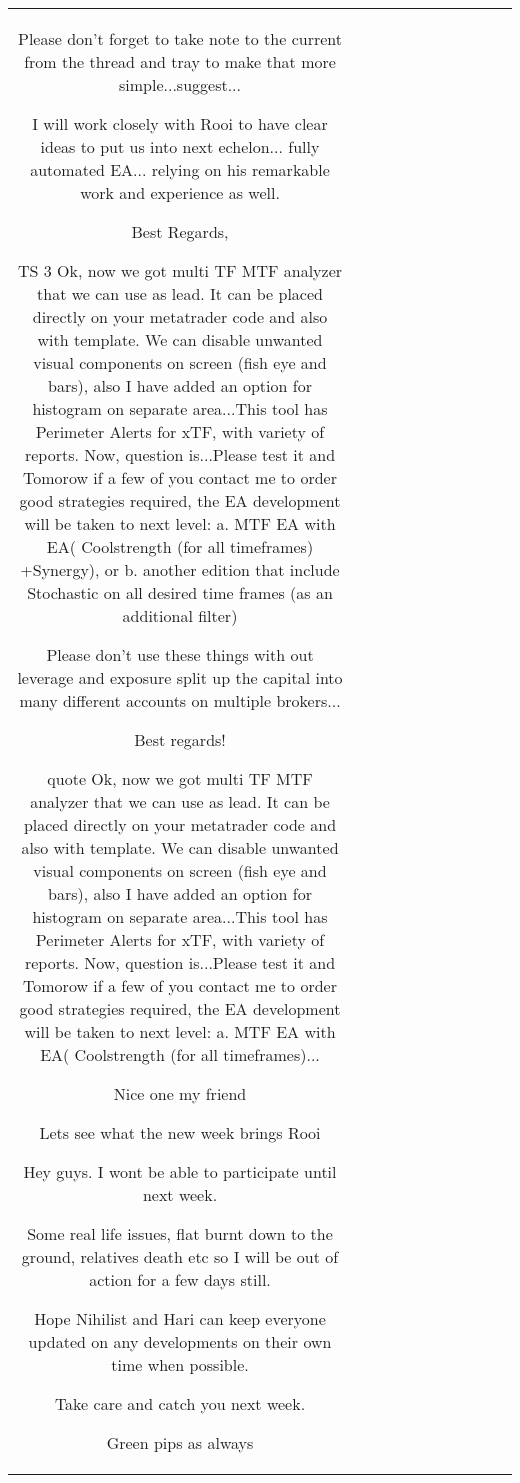 \begin{table}[h!]
\begin{tabular}{|c|c|c|c|c|c|c|c|c|c|c|}
Please don't forget to take note to the current from the thread and tray to make that more simple...suggest...

I will work closely with Rooi to have clear ideas to put us into next echelon... fully automated EA... relying on his remarkable work and experience as well.

Best Regards, 

TS
3
Ok, now we got multi TF MTF analyzer that we can use as lead. It can be placed directly on your metatrader code and also with template.
We can disable unwanted visual components on screen (fish eye and bars), also I have added an option for histogram on separate area...This tool has Perimeter Alerts for xTF, with variety of reports.
Now, question is...Please test it and Tomorow if a few of you contact me to order good strategies required, the EA development will be taken to next level: a. MTF EA with EA( Coolstrength (for all timeframes) +Synergy), or b. another edition that include Stochastic on all desired time frames (as an additional filter)

Please don't use these things with out leverage and exposure split up the capital into many different accounts on multiple brokers...

Best regards!

{quote} Ok, now we got multi TF MTF analyzer that we can use as lead. It can be placed directly on your metatrader code and also with template. We can disable unwanted visual components on screen (fish eye and bars), also I have added an option for histogram on separate area...This tool has Perimeter Alerts for xTF, with variety of reports. Now, question is...Please test it and Tomorow if a few of you contact me to order good strategies required, the EA development will be taken to next level: a. MTF EA with EA( Coolstrength (for all timeframes)...

Nice one my friend 

Lets see what the new week brings
Rooi


Hey guys. I wont be able to participate until next week.

Some real life issues, flat burnt down to the ground, relatives death etc so I will be out of action for a few days still.

Hope Nihilist and Hari can keep everyone updated on any developments on their own time when possible.

Take care and catch you next week.

Green pips as always


\end{tabular}
\end{table}
